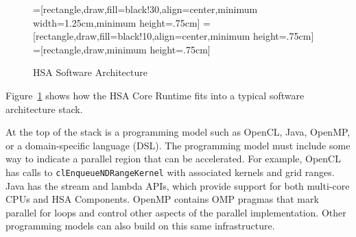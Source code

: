 \documentclass[final]{book}
\begin{document}
\begin{figure}
  \centering
  =[rectangle,draw,fill=black!30,align=center,minimum width=1.25cm,minimum height=.75cm]
  =[rectangle,draw,fill=black!10,align=center,minimum height=.75cm]
  =[rectangle,draw,minimum height=.75cm]
  \caption{HSA Software Architecture}
  \label{fig:swarch}
\end{figure}

Figure~\ref{fig:swarch} shows how the HSA Core Runtime fits into a
typical software architecture stack.

At the top of the stack is a programming model such as OpenCL\texttrademark,
Java, OpenMP, or a domain-specific language (DSL). The programming model must
include some way to indicate a parallel region that can be accelerated. For
example, OpenCL has calls to \texttt{clEnqueueNDRangeKernel} with associated
kernels and grid ranges. Java has the stream and lambda APIs, which provide
support for both multi-core CPUs and HSA Components. OpenMP contains OMP pragmas
that mark parallel for loops and control other aspects of the parallel
implementation.  Other programming models can also build on this same
infrastructure.
\end{document}
